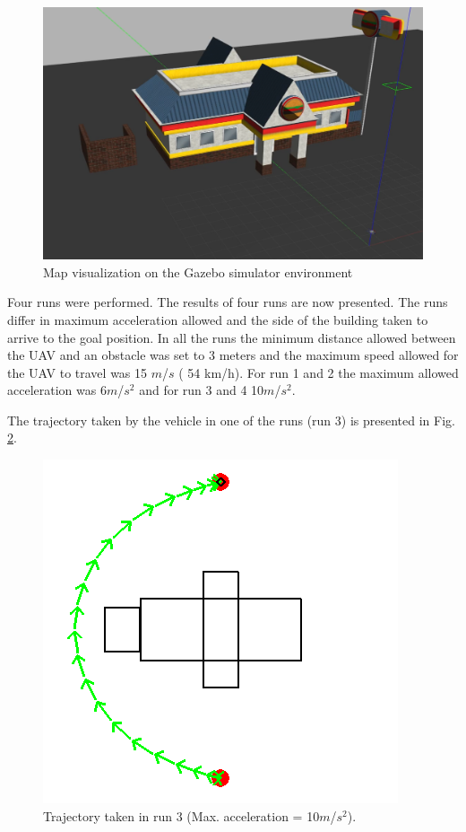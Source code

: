 \begin{figure}[!ht]
    \centering
    \includegraphics[width=0.9\linewidth]{Figures/07_simulation/Sim/mapGazebo.png}
    \caption{Map visualization on the Gazebo simulator environment}
    \label{mapPrespectiveSim}
\end{figure}

Four runs were performed. The results of four runs are now presented. The runs differ in maximum acceleration allowed and the side of the building taken to arrive to the goal position. In all the runs the minimum distance allowed between the UAV and an obstacle was set to 3 meters and the maximum speed allowed for the UAV to travel was 15 $m$/$s$ ( 54 km/h). For run 1 and 2 the maximum allowed acceleration was 6$m$/$s^2$ and for run 3 and 4 10$m$/$s^2$.

The trajectory taken by the vehicle in one of the runs (run 3) is presented in Fig. \ref{trajRun3}.

\begin{figure}[ht!]
    \centering
    \includegraphics[width=0.6\linewidth]{Figures/07_simulation/Sim/trajL10.png}
    \caption{Trajectory taken in run 3 (Max. acceleration = 10$m$/$s^2$).}
    \label{trajRun3}
\end{figure}

